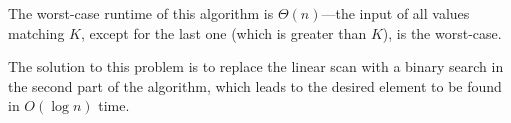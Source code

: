\begin{comment}
Here is an implementation in Python:
\begin{lstlisting}[basicstyle=\footnotesize,numbers=left,breaklines=true,language=Python]
import math
 
# Find first element larger than k in sorted array
def firstElementLargerThanK(arr, k):
    # use binary search to find position of k or neighbor if not found
    top = len(arr) - 1
    bot = 0
    foundK = False
    while (bot <= top and foundK == False):
        mid = bot + ((top - bot + 1) / 2)
        if arr[mid] < k:
            bot = mid + 1
        if arr[mid] > k:
            top = mid - 1
        if arr[mid] == k:
            foundK = True
 
    # if neighbor is greater, we are done
    if arr[mid] > k:
        return mid, arr[mid]
    else:
        for i in range(mid + 1, len(arr)):
            if arr[i] > k:
                return i, arr[i]
        return 0, 0
\end{lstlisting}

Here are the test runs:

{\footnotesize
\begin{verbatim} 
a1 = [6, 23, 22, 81, 4, 2, 5, 5, 10, 9, 47]
a1.sort()
firstElementLargerThanK(a1, 21) = (7, 22)

a2 = [6, 23, 22, 81, 21, 2, 5, 5, 10, 9, 47]
a2.sort()
firstElementLargerThanK(a2, 21) = (7, 22)

a3 = [6, 23, 22, 81, 4, 2, 5, 5, 36, 9, 47]
a3.sort()
firstElementLargerThanK(a3, 21) = (6, 22)

a4 = [5, 5, 5, 5, 5, 5, 5, 5, 5, 5, 5, 5, 5, 5, 5, 5, 5, 5, 5, 5, 6]
a4.sort()
firstElementLargerThanK(a4, 5) = (12, 6)
\end{verbatim} 
}
\end{comment}

The worst-case runtime of this algorithm is $\Theta(n)$---the 
input of all values matching $K$, except for 
the last one (which is greater than $K$), is the worst-case.

The solution to this problem is to replace the linear scan with a binary search 
in the second part of the algorithm, which  
leads to the desired element to be found in $O(\log n)$ time.

\begin{comment}
The problem with this, of course, is that the worst-case input may not be 
the ``typical'' input. If we expect a uniform random distribution of values from a large range, 
the expected time to reach the next larger element after having found the position for $K$ 
would be constant, i.e., we would expect to find the next biggest element in a
small number of steps, regardless of $n$. In the case of a million unique randomly distributed sorted values, our original 
algorithm would solve the first part of the problem in $\log_2(1,000,000) = 20$ steps and then 
exactly one step for the second part, compared to another 19 steps for the ``improved'' 
algorithm that used a second binary search.
\end{comment}

